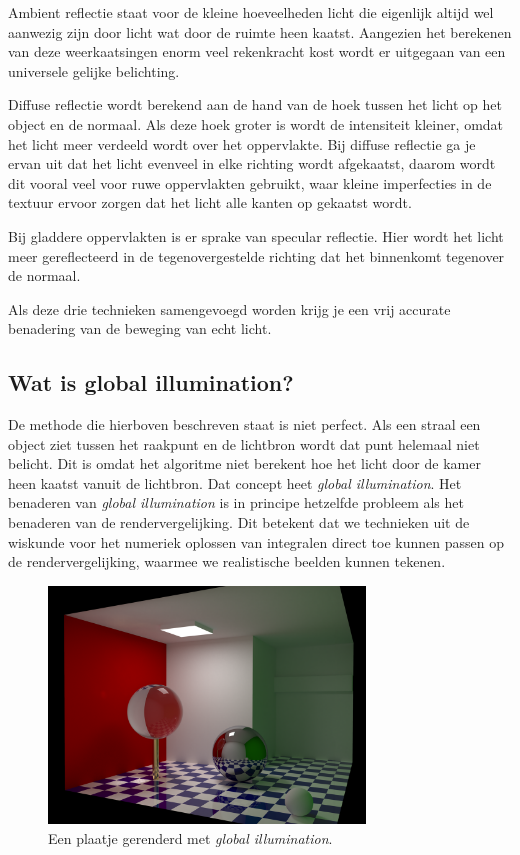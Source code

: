 \documentclass[12pt, a4paper]{article}
\begin{document}
Ambient reflectie staat voor de kleine hoeveelheden licht die eigenlijk altijd wel aanwezig zijn door licht wat door de ruimte heen kaatst. Aangezien het berekenen van deze weerkaatsingen enorm veel rekenkracht kost wordt er uitgegaan van een universele gelijke belichting. 

Diffuse reflectie wordt berekend aan de hand van de hoek tussen het licht op het object en de normaal. Als deze hoek groter is wordt de intensiteit kleiner, omdat het licht meer verdeeld wordt over het oppervlakte. Bij diffuse reflectie ga je ervan uit dat het licht evenveel in elke richting wordt afgekaatst, daarom wordt dit vooral veel voor ruwe oppervlakten gebruikt, waar kleine imperfecties in de textuur ervoor zorgen dat het licht alle kanten op gekaatst wordt.

Bij gladdere oppervlakten is er sprake van specular reflectie. Hier wordt het licht meer gereflecteerd in de tegenovergestelde richting dat het binnenkomt tegenover de normaal. 

Als deze drie technieken samengevoegd worden krijg je een vrij accurate benadering van de beweging van echt licht.

\subsection{Wat is global illumination?}
De methode die hierboven beschreven staat is niet perfect. Als een straal een object ziet tussen het raakpunt en de lichtbron wordt dat punt helemaal niet belicht. Dit is omdat het algoritme niet berekent hoe het licht door de kamer heen kaatst vanuit de lichtbron. Dat concept heet \emph{global illumination}. Het benaderen van \emph{global illumination} is in principe hetzelfde probleem als het benaderen van de rendervergelijking. Dit betekent dat we technieken uit de wiskunde voor het numeriek oplossen van integralen direct toe kunnen passen op de rendervergelijking, waarmee we realistische beelden kunnen tekenen. 

\begin{figure}[H]
    \centering
    \includegraphics[width=0.75\textwidth]{global_illumination.png}
    \caption{Een plaatje gerenderd met \emph{global illumination}.}
    \label{fig:global_illumination}
\end{figure}
\end{document}
